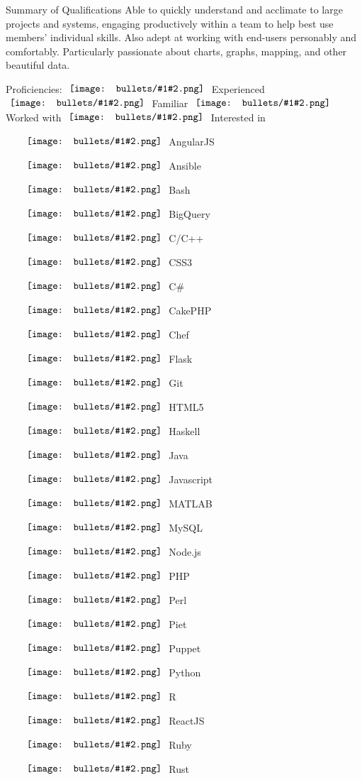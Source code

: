 \documentclass[letterpaper,10pt]{article}
\newcommand{\gbullet}[2][circle]{
  \vcenter{\hbox{
    \texttt{[image: bullets/\#1\#2.png]}
    \vspace{2pt}
  }}
}
\begin{document}
\begin{res_section}{Summary of Qualifications}
  \vskip 4pt Able to quickly understand and acclimate to large projects and systems, engaging productively within a team to help best use members' individual skills.
  Also adept at working with end-users personably and comfortably.  Particularly passionate about charts, graphs, mapping, and other beautiful data.
\begin{res_content}{Proficiencies: \small \hfill $\gbullet{4}$ Experienced $\gbullet{3}$ Familiar $\gbullet{2}$ Worked with $\gbullet{1}$ Interested in}
  \rmfamily \normalsize
  \def \multicolsep {4pt}
  \setlength{\columnsep}{2pt}
  \begin{multicols}{6}
  \begin{itemize}[labelsep=0em]
    \item[$\gbullet{4}$] AngularJS
    \item[$\gbullet{3}$] Ansible
    \item[$\gbullet{3}$] Bash
    \item[$\gbullet{3}$] BigQuery
    \item[$\gbullet{3}$] C/C++
    \item[$\gbullet{4}$] CSS3
    \item[$\gbullet{3}$] C\#
    \item[$\gbullet{4}$] CakePHP
    \item[$\gbullet{3}$] Chef
    \item[$\gbullet{3}$] Flask
    \item[$\gbullet{4}$] Git
    \item[$\gbullet{4}$] HTML5
    \item[$\gbullet{2}$] Haskell
    \item[$\gbullet{3}$] Java
    \item[$\gbullet{4}$] Javascript
    \item[$\gbullet{2}$] MATLAB
    \item[$\gbullet{4}$] MySQL
    \item[$\gbullet{3}$] Node.js
    \item[$\gbullet{4}$] PHP
    \item[$\gbullet{3}$] Perl
    \item[$\gbullet{2}$] Piet
    \item[$\gbullet{4}$] Puppet
    \item[$\gbullet{4}$] Python
    \item[$\gbullet{3}$] R
    \item[$\gbullet{3}$] ReactJS
    \item[$\gbullet{2}$] Ruby
    \item[$\gbullet{1}$] Rust

\end{itemize}
\end{multicols}
\end{res_content}
\end{res_section}
\end{document}
